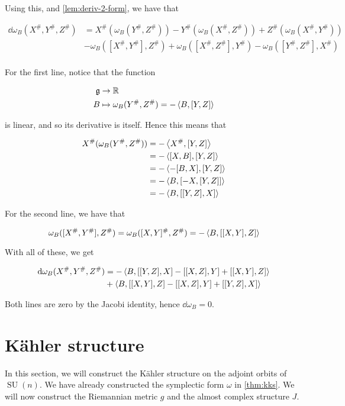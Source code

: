 \documentclass{article}
\DeclareMathOperator{\SU}{SU}
\begin{document}
Using this, and \cref{lem:deriv-2-form}, we have that

\begin{align*}
    \dd\omega_B(X^\#, Y^\#, Z^\#) &= X^\#(\omega_B(Y^\#, Z^\#)) - Y^\#(\omega_B(X^\#, Z^\#)) + Z^\#(\omega_B(X^\#, Y^\#)) \\
    &- \omega_B([X^\#, Y^\#], Z^\#) + \omega_B([X^\#, Z^\#], Y^\#) - \omega_B([Y^\#, Z^\#], X^\#) \\
\end{align*}

For the first line, notice that the function

\begin{align*}
    \mathfrak{g} &\to \mathbb{R} \\
    B &\mapsto \omega_B(Y^\#, Z^\#) = -\left\langle B, [Y, Z] \right\rangle
\end{align*}

is linear, and so its derivative is itself. Hence this means that

\begin{align*}
    X^\#(\omega_B(Y^\#, Z^\#)) &= -\left\langle X^\#, [Y, Z] \right\rangle \\
    &= -\left\langle [X, B], [Y, Z] \right\rangle \\
    &= -\left\langle -[B, X], [Y, Z] \right\rangle \\
    &= -\left\langle B, [-X, [Y, Z]] \right\rangle \\
    &= -\left\langle B, [[Y, Z], X] \right\rangle
\end{align*}

For the second line, we have that

\[\omega_B([X^\#, Y^\#], Z^\#) = \omega_B([X, Y]^\#, Z^\#) = -\left\langle B, [[X, Y], Z] \right\rangle\]

With all of these, we get

\begin{align*}
    \dd\omega_B(X^\#, Y^\#, Z^\#) &= -\left\langle B, [[Y, Z], X] - [[X, Z], Y] + [[X, Y], Z] \right\rangle \\
    &+\left\langle B, [[X, Y], Z] - [[X, Z], Y] + [[Y, Z], X] \right\rangle
\end{align*}

Both lines are zero by the Jacobi identity, hence \(\dd\omega_B = 0\).

\section{K\"ahler structure}

\label{sec:kahler}

In this section, we will construct the K\"ahler structure on the adjoint orbits of \(\SU(n)\). We have already constructed the symplectic form \(\omega\) in \cref{thm:kks}. We will now construct the Riemannian metric \(g\) and the almost complex structure \(J\).
\end{document}
